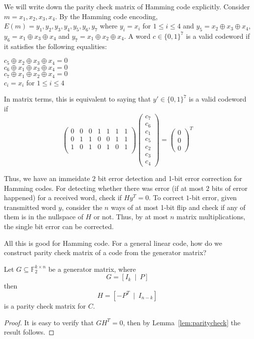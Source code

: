 We will write down the parity check matrix of Hamming code explicitly. Consider $m=x_1,x_2,x_3,x_4$. By the Hamming code encoding, $E(m)=y_1,y_2,y_3,y_4,y_5,y_6,y_7$ where $y_i=x_i$ for $1 \leq i \leq 4$ and $y_5=x_2 \oplus x_3 \oplus x_4$, $y_6=x_1 \oplus x_3 \oplus x_4$ and $y_7=x_1 \oplus x_2 \oplus x_4$. A word $c\in \{0,1\}^7$ is a valid codeword if it satisfies the following equalities:
\begin{center}
$c_5 \oplus x_2 \oplus x_3 \oplus x_4 =0$\\
$c_6 \oplus x_1 \oplus x_3 \oplus x_4 =0$ \\
$c_7 \oplus x_1 \oplus x_2 \oplus x_4 =0$\\
$c_i=x_i$ for $1 \leq i \leq 4$
\end{center}
In matrix terms, this is equivalent to saying that $y'\in \{0,1\}^7$ is a valid codeword if 
\[
\left( \begin{array}{ccccccc}
0 & 0 & 0 & 1 & 1 & 1 & 1\\
0 & 1 & 1 & 0 & 0 & 1 & 1\\
1 & 0 & 1 & 0 & 1 & 0 & 1\\
\end{array} \right)
\left( \begin{array}{c}
c_7 \\ 
c_6 \\
c_1 \\
c_5 \\
c_2 \\
c_3 \\
c_4
\end{array} \right)
=\left( \begin{array}{c}
0 \\ 
0 \\
0
\end{array} \right)^T
\]

Thus, we have an immeidate $2$ bit error detection and 1-bit error correction for Hamming codes. For detecting whether there was error (if at most $2$ bits of error happened) for a received word, check if $Hy^T = 0$. To correct $1$-bit error, given transmitted word $y$, consider the $n$ ways of at most 1-bit flip and check if any of them is in the nullspace of $H$ or not. Thus, by at most $n$ matrix multiplications, the single bit error can be corrected. 

All this is good for Hamming code. For a general linear code, how do we construct parity check matrix of a code from the generator matrix?

\begin{lemma}
Let $G\subseteq {\mathbb{F}}_{2}^{k\times n}$ be a generator matrix, where
\[G= \left[ I_k~\mid~P\right]\]
then
\[H= \left[-P^T~\mid~I_{n-k}\right]\]
is a parity check matrix for $C$.
\end{lemma}
\begin{proof}
It is easy to verify that $GH^T=0$, then by Lemma~\ref{lem:paritycheck} the result follows.
\end{proof}

